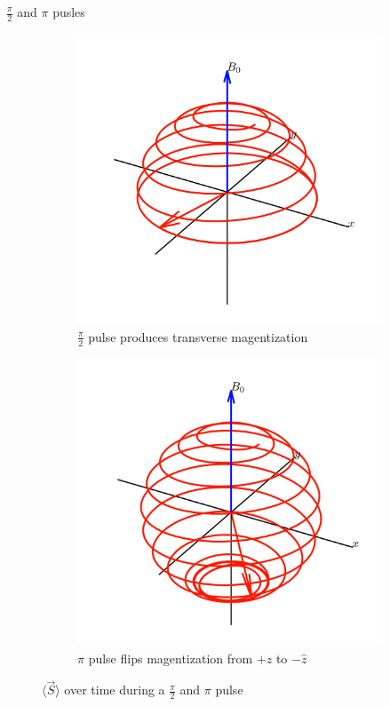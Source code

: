 \documentclass[aspectratio=169,xcolor=dvipsnames]{beamer}
\newcommand{\halfpi}{\frac{\pi}{2}}
\begin{document}
\begin{frame}{$\halfpi$ and $\pi$ pusles}
    \begin{figure}
        \centering
        \begin{subfigure}{0.4\linewidth}
            \includegraphics[width = \linewidth]{figs/pi-2-pulse.png}
            \caption{$\halfpi$ pulse produces transverse magentization}
        \end{subfigure}
        \begin{subfigure}{0.4\linewidth}
            \includegraphics[width = \linewidth]{figs/pi-pulse.png}
            \caption{$\pi$ pulse flips magentization from $+\hat{z}$ to $-\hat{z}$}
        \end{subfigure}
        \caption{$\langle \vec{S} \rangle$ over time during a $\halfpi$ and $\pi$ pulse}\label{fig:pulse-spirals}
    \end{figure}
\end{frame}
\end{document}
